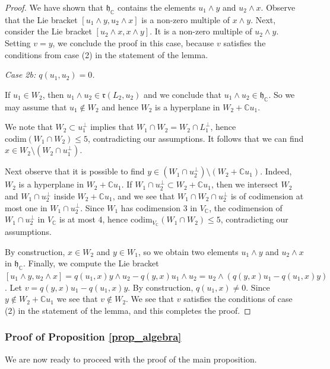 \documentclass[11pt]{article}
\newcommand{\6}{\partial}
\newcommand{\bbC}{\mathbb{C}}
\newcommand{\frh}{\mathfrak{h}}
\newcommand{\frr}{\mathfrak{r}}
\renewcommand{\le}{\leqslant}
\newcommand{\wdg}{\wedge}
\begin{document}
\begin{proof}
We have shown that $\frh_\bbC$ contains the elements $u_1\wdg y$ and $u_2\wdg x$.
Observe that the Lie bracket $[u_1\wdg y, u_2\wdg x]$ is a non-zero multiple of $x\wdg y$.
Next, consider the Lie bracket $[u_2\wdg x,x\wdg y]$. It is a non-zero multiple
of $u_2\wdg y$. Setting $v = y$, we conclude the proof in this case, because
$v$ satisfies the conditions from case (2) in the statement of the lemma.

\medskip
{\it Case 2b: $q(u_1,u_2) = 0$.}

If $u_1\in W_2$, then $u_1\wdg u_2 \in \frr(L_2, u_2)$ and we conclude that $u_1\wdg u_2\in \frh_\bbC$.
So we may assume that $u_1\notin W_2$ and hence $W_2$ is a hyperplane in $W_2+ \bbC u_1$.

We note that $W_2\subset u_1^\perp$ implies that $W_1\cap W_2 = W_2\cap L_1^\perp$, hence
$\mathrm{codim}(W_1\cap W_2)\le 5$, contradicting our assumptions. It follows that
we can find $x\in W_2\setminus (W_2\cap u_1^\perp)$.

Next observe that it is possible to find $y\in (W_1\cap u_2^\perp)\setminus (W_2+ \bbC u_1)$.
Indeed, $W_2$ is a hyperplane in $W_2+ \bbC u_1$. If $W_1\cap u_2^\perp\subset W_2+ \bbC u_1$,
then we intersect $W_2$ and $W_1\cap u_2^\perp$ inside $W_2+ \bbC u_1$, and we see that $W_1 \cap W_2\cap u_2^\perp$ is of
codimension at most one in $W_1\cap u_2^\perp$. Since $W_1$ has codimension 3 in $V_\bbC$,
the codimension of $W_1\cap u_2^\perp$ in $V_\bbC$ is at most 4, hence $\mathrm{codim}_{V_\bbC}(W_1\cap W_2)\le 5$,
contradicting our assumptions.

By construction, $x\in W_2$ and $y\in W_1$, so we obtain two elements $u_1\wdg y$ and $u_2\wdg x$ in $\frh_\bbC$.
Finally, we compute the Lie bracket $[u_1\wdg y, u_2\wdg x] = q(u_1,x)y\wdg u_2 -q(y,x)u_1\wdg u_2
= u_2\wdg(q(y,x)u_1 - q(u_1,x)y)$. Let $v = q(y,x)u_1 - q(u_1,x)y$.
By construction, $q(u_1,x)\neq 0$. Since $y\notin W_2+ \bbC u_1$ we see that $v\notin W_2$.
We see that $v$ satisfies the conditions of case (2) in the statement of
the lemma, and this completes the proof.
\end{proof}

\subsubsection{Proof of Proposition \ref{prop_algebra}}\label{prop_proof}
We are now ready to proceed with the proof of the main proposition.
\end{document}
